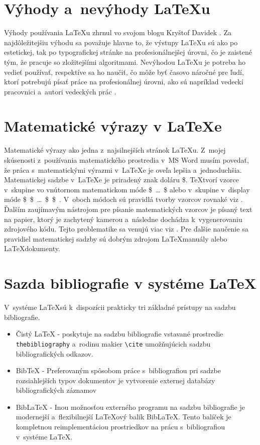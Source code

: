 \documentclass[a4paper, 11pt]{article}
\begin{document}
\section{Výhody a~nevýhody \LaTeX u}
Výhody používania \LaTeX u zhrnul vo svojom blogu Kryštof Davidek \cite{OnlineDavidek}. Za najdôležitejšiu výhodu sa považuje hlavne to, že výstupy \LaTeX u sú ako po estetickej, tak po typografickej stránke na profesionálnejšej úrovni, čo je zaistené tým, že pracuje so zložitejšími algoritmami. Nevýhodou \LaTeX u je potreba ho vedieť používať, respektíve sa ho naučiť, čo môže byť časovo náročné pre ľudí, ktorí potrebujú písať práce na profesionálnej úrovni, ako sú napríklad vedeckí pracovnici a~autori vedeckých prác \cite{DiplPracBartlik}.   

\section{Matematické výrazy v \LaTeX e}
Matematické výrazy ako jedna z~najsilnejších stránok \LaTeX u. Z~mojej skúsenosti z~používania matematického prostredia v~MS Word musím povedať, že práca s~matematickými výrazmi v~\LaTeX e je oveľa lepšia a~jednoduchšia. Matematickej sadzbe v~\LaTeX e je priradený znak doláru \$. \TeX\:tvorí vzorce v~skupine vo vnútornom matematickom móde \$~\dots~\$ alebo v~skupine v~display móde \$~\$~\dots~\$~\$~. V~oboch módoch sú pravidlá tvorby vzorcov rovnaké viz \cite{CasopisZpravodajOlsak}. Ďalším zaujímavým nástrojom pre písanie matematických vzorcov je písaný text na papier, ktorý je zachytený kamerou a~následne dochádza k~vygenerovaniu zdrojového kódu. Tejto problematike sa venujú viac viz \cite{ClanokSkanovanie}. Pre ďalšie naučenie sa pravidiel matematickej sadzby sú dobrým zdrojom \LaTeX\:manuály alebo \LaTeX\:dokumenty.

\newpage
\section{Sazda bibliografie v systéme \LaTeX}
V~systéme \LaTeX\:sú k~dispozícii prakticky tri základné prístupy na sadzbu bibliografie.
\begin{itemize}
\item Čistý \LaTeX\: - poskytuje na sadzbu bibliografie vstavané prostredie \verb|thebibliography| a~rodinu makier \verb|\cite| umožňujúcich sadzbu bibliografických odkazov.
\item  Bib\TeX\: - Preferovaným spôsobom práce s~bibliografiou pri sadzbe rozsiahlejších typov dokumentov je vytvorenie externej databázy bibliografických záznamov
\item Bib\LaTeX\: - Inou možnosťou externého programu na sadzbu bibliografie je modernejší a~flexibilnejší \LaTeX ový balík Bib\LaTeX\:. Tento balíček je kompletnou reimplementáciou prostriedkov na prácu s~bibliografiou v~systéme \LaTeX . \cite{ClanokZpravodajLuptak}
\end{itemize}

\newpage
	
	\renewcommand{\refname}{Literatúra}
	
\end{document}
